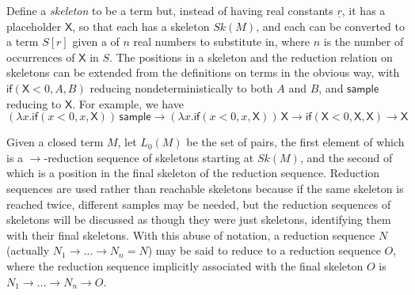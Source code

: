 \documentclass{article}
\newcommand{\tif}[3]{\mathsf{if}(#1, #2, #3)} %
\newcommand{\tsample}{\mathsf{sample}}
\newcommand{\skeletonPlaceholder}{\mathsf{X}} %
\theoremstyle{definition}
\theoremstyle{lemma}
\theoremstyle{remark}
\begin{document}
Define a \emph{skeleton} to be a term but, instead of having real constants $\underline r$, it has a placeholder $\skeletonPlaceholder$, so that each  has a skeleton $Sk(M)$, and each  can be converted to a term $S[r]$ given a  of $n$ real numbers to substitute in, where $n$ is the number of occurrences of $\skeletonPlaceholder$ in $S$. 
The positions in a skeleton and the reduction relation on skeletons can be extended from the definitions on terms in the obvious way, with $\tif{\skeletonPlaceholder < 0}{A}{B}$ reducing nondeterministically to both $A$ and $B$, and $\tsample$ reducing to $\skeletonPlaceholder$.
For example, we have 
\(
(\lambda x . \tif{x < 0}{x}{\skeletonPlaceholder}) \, \tsample
\to
(\lambda x . \tif{x < 0}{x}{\skeletonPlaceholder}) \, \skeletonPlaceholder
\to
\tif{\skeletonPlaceholder < 0}{\skeletonPlaceholder}{\skeletonPlaceholder}
\to
\skeletonPlaceholder
\)

Given a closed term $M$, let $L_0(M)$ be the set of pairs, the first element of which is a $\to$-reduction sequence of skeletons starting at $Sk(M)$, and the second of which is a position in the final skeleton of the reduction sequence. 
Reduction sequences are used rather than reachable skeletons because if the same skeleton is reached twice, different samples may be needed,  but the reduction sequences of skeletons will be discussed as though they were just skeletons, identifying them with their final skeletons. With this abuse of notation, a reduction sequence $N$ (actually $N_1 \to \dots \to N_n = N$) may be said to reduce to a reduction sequence $O$, where the reduction sequence implicitly associated with the final skeleton $O$ is $N_1 \to \dots \to N_n \to O$.

\end{document}
